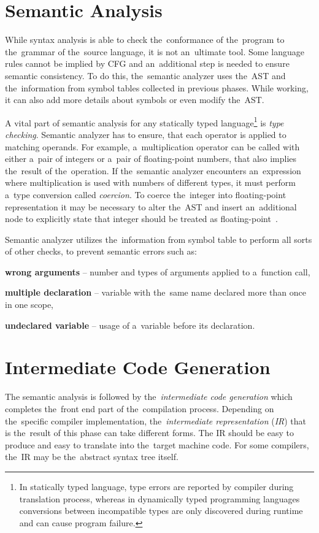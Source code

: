 \documentclass[
  digital, %
  table,   %
  lof,     %
  lot,     %
  oneside,
]{fithesis3}
\begin{document}
  \section{Semantic Analysis}
While syntax analysis is able to check the~conformance of the~program to the~grammar of the~source language, it is not an~ultimate tool. Some language rules cannot be implied by CFG and an~additional step is needed to ensure semantic consistency. To do this, the~semantic analyzer uses the~AST and the~information from symbol tables collected in previous phases. While working, it can also add more details about symbols or even modify the~AST. 

A vital part of semantic analysis for any statically typed language\footnote{In statically typed language, type errors are reported by compiler during translation process, whereas in dynamically typed programming languages conversions between incompatible types are only discovered during runtime and can cause program failure.} is \textit{type checking}. Semantic analyzer has to ensure, that each operator is applied to matching operands. For example, a~multiplication operator can be called with either a~pair of integers or a~pair of floating-point numbers, that also implies the~result of the~operation. If the~semantic analyzer encounters an~expression where multiplication is used with numbers of different types, it must perform a~type conversion called \textit{coercion}. To coerce the~integer into floating-point representation it may be necessary to alter the~AST and insert an~additional node to explicitly state that integer should be treated as floating-point~\cite{dragon-book}. 

Semantic analyzer utilizes the~information from symbol table to perform all sorts of other checks, to prevent semantic errors such as:
\begin{compactitem}
  \item \textbf{wrong arguments} -- number and types of arguments applied to a~function call,
  \item \textbf{multiple declaration} -- variable with the~same name declared more than once in one scope,
  \item \textbf{undeclared variable} -- usage of a~variable before its declaration.
\end{compactitem}
    
  \section{Intermediate Code Generation}
The semantic analysis is followed by the~\textit{intermediate code generation} which completes the~front end part of the~compilation process. Depending on the~specific compiler implementation, the~\textit{intermediate representation} (\textit{IR}) that is the~result of this phase can take different forms. The IR should be easy to produce and easy to translate into the~target machine code. For some compilers, the~IR may be the~abstract syntax tree itself.
\end{document}
